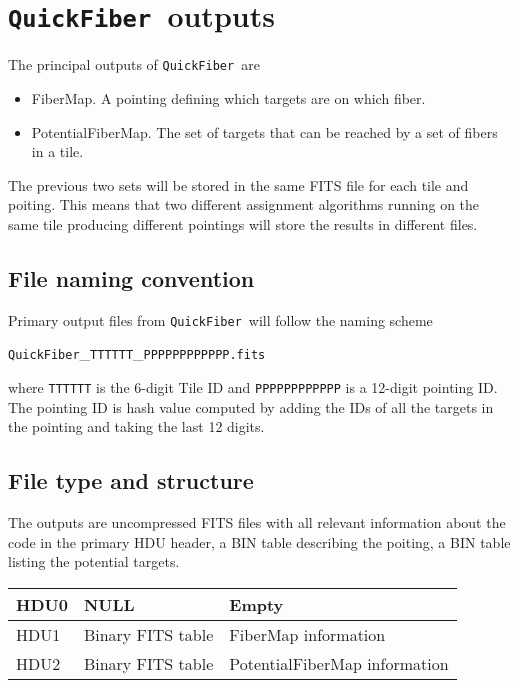 \documentclass{article}
\newcommand{\code}{{\texttt{QuickFiber}}}
\begin{document}
\section{\code\ outputs}

The principal outputs of \code\ are
\begin{itemize}
\item FiberMap. A pointing defining which targets are on which
  fiber.
\item PotentialFiberMap. The set of targets that can be reached by a
  set of fibers in a  tile.  
\end{itemize}

The previous two sets will be stored in the same FITS file for each
tile and poiting. This means that two different assignment algorithms
running on the same tile producing different pointings will store
the results in different files. 

\subsection{File naming convention}

Primary output files from \code\ will follow the naming scheme

\begin{center}
\code\_{\texttt{TTTTTT}}\_{\texttt{PPPPPPPPPPPP.fits}}
\end{center}
\noindent
where \texttt{TTTTTT} is the 6-digit Tile ID and \texttt{PPPPPPPPPPPP} is
a 12-digit pointing ID. The pointing ID is hash value computed by
adding the IDs of all the targets in the pointing and taking the last
12 digits. 

\subsection{File type and structure}
The outputs are uncompressed FITS files with all relevant
information about the code in the primary HDU header, a BIN table
describing the poiting, a BIN table listing the potential targets. 

\begin{center}
\begin{tabular}{|l|l|l|}\hline
HDU0 & NULL & Empty\\\hline
HDU1 & Binary FITS table & FiberMap information\\\hline
HDU2 & Binary FITS table & PotentialFiberMap information\\\hline
\end{tabular}
\end{center}
\end{document}
